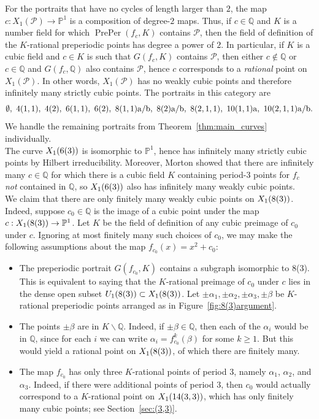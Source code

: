 \documentclass[12pt]{amsart}
\theoremstyle{definition}
\newcommand{\bbP}{\mathbb{P}}
\newcommand{\bbQ}{\mathbb{Q}}
\newcommand{\calP}{\mathcal{P}}
\newcommand{\PrePer}{\operatorname{PrePer}}
\numberwithin{equation}{section}
\begin{document}
For the portraits that have no cycles of length larger than $2$, the map $c : X_1(\calP) \to \bbP^1$ is a composition of degree-$2$ maps. Thus, if $c \in \bbQ$ and $K$ is a number field for which $\PrePer(f_c,K)$ contains $\calP$, then the field of definition of the $K$-rational preperiodic points has degree a power of $2$. In particular, if $K$ is a cubic field and $c \in K$ is such that $G(f_c,K)$ contains $\calP$, then either $c \notin \bbQ$ or $c \in \bbQ$ and $G(f_c,\bbQ)$ also contains $\calP$, hence $c$ corresponds to a \textit{rational} point on $X_1(\calP)$. In other words, $X_1(\calP)$ has no weakly cubic points and therefore infinitely many strictly cubic points. The portraits in this category are
\[\rm
    \emptyset,\  4(1,1),\  4(2),\  6(1,1),\  6(2),\  8(1,1)a/b,\  8(2)a/b,\  8(2,1,1),\  10(1,1)a,\  10(2,1,1)a/b.
\]
We handle the remaining portraits from Theorem~\ref{thm:main_curves} individually.\\

 The curve $X_1({\rm 6(3)})$ is isomorphic to $\bbP^1$, hence has infinitely many strictly cubic points by Hilbert irreducibility. Moreover, Morton \cite[Theorem 2(b)]{morton:1992} showed that there are infinitely many $c \in \bbQ$ for which there is a cubic field $K$ containing period-$3$ points for $f_c$ \emph{not} contained in $\bbQ$, so $X_1({\rm 6(3)})$ also has infinitely many weakly cubic points.\\

We claim that there are only finitely many weakly cubic points on $X_1({\rm 8(3)})$.
Indeed, suppose $c_0 \in \bbQ$ is the image of a cubic point under the map $c : X_1({\rm 8(3)}) \to \bbP^1$.
Let $K$ be the field of definition of any cubic preimage of $c_0$ under $c$. Ignoring at most finitely many such choices of $c_0$, we may make the following assumptions about the map $f_{c_0}(x) = x^2 + c_0$:
    \begin{itemize}
    \item The preperiodic portrait $G(f_{c_0}, K)$ contains a subgraph isomorphic to 8(3). This is equivalent to saying that the $K$-rational preimage of $c_0$ under $c$ lies in the dense open subset $U_1({\rm 8(3)}) \subset X_1({\rm 8(3)})$. Let $\pm \alpha_1,\pm\alpha_2,\pm\alpha_3,\pm\beta$ be $K$-rational preperiodic points arranged as in Figure~\ref{fig:8(3)argument}.
    \item The points $\pm \beta$ are in $K \smallsetminus\bbQ$. Indeed, if $\pm \beta \in \bbQ$, then each of the $\alpha_i$ would be in $\bbQ$, since for each $i$ we can write $\alpha_i = f_{c_0}^k(\beta)$ for some $k\ge1$. But this would yield a rational point on $X_1({\rm 8(3)})$, of which there are finitely many. 
    \item The map $f_{c_0}$ has only three $K$-rational points of period $3$, namely $\alpha_1$, $\alpha_2$, and $\alpha_3$. Indeed, if there were additional points of period $3$, then $c_0$ would actually correspond to a $K$-rational point on $X_1({\rm 14(3,3)})$, which has only finitely many cubic points; see Section~\ref{sec:(3,3)}.
    \end{itemize}
\end{document}
